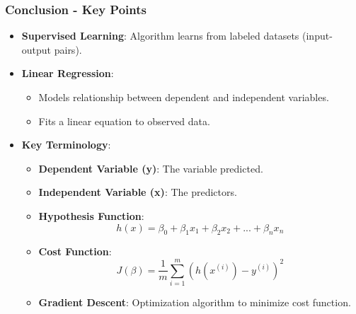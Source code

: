 \documentclass[aspectratio=169]{beamer}
\begin{document}
\begin{frame}[fragile]
    \frametitle{Conclusion - Key Points}
    \begin{itemize}
        \item \textbf{Supervised Learning}: Algorithm learns from labeled datasets (input-output pairs).
        \item \textbf{Linear Regression}:
        \begin{itemize}
            \item Models relationship between dependent and independent variables.
            \item Fits a linear equation to observed data.
        \end{itemize}
        \item \textbf{Key Terminology}:
        \begin{itemize}
            \item \textbf{Dependent Variable (y)}: The variable predicted.
            \item \textbf{Independent Variable (x)}: The predictors.
            \item \textbf{Hypothesis Function}:
            \begin{equation}
                h(x) = \beta_0 + \beta_1 x_1 + \beta_2 x_2 + ... + \beta_n x_n
            \end{equation}
            \item \textbf{Cost Function}:
            \begin{equation}
                J(\beta) = \frac{1}{m} \sum_{i=1}^{m} (h(x^{(i)}) - y^{(i)})^2
            \end{equation}
            \item \textbf{Gradient Descent}: Optimization algorithm to minimize cost function.
        \end{itemize}
    \end{itemize}
\end{frame}
\end{document}
